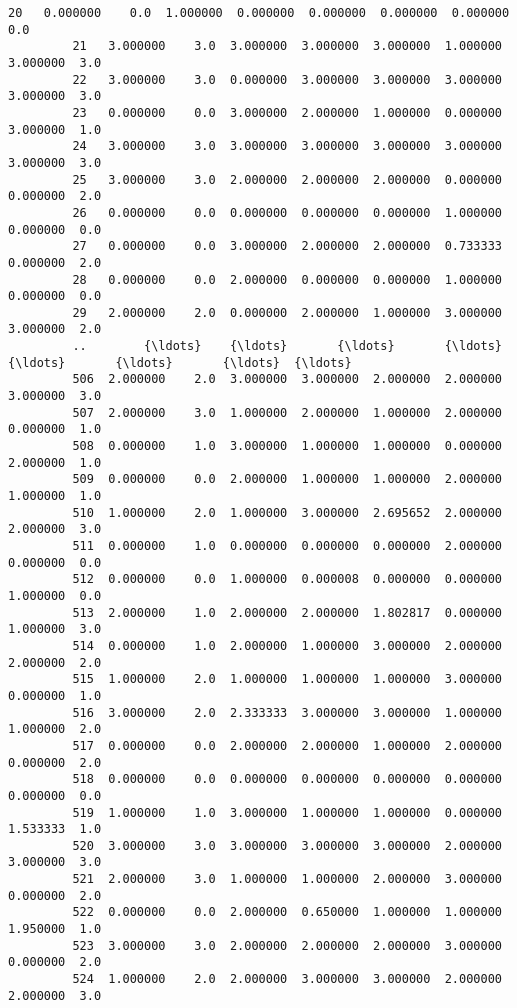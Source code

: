 \documentclass[11pt]{article}
\begin{document}
\begin{Verbatim}[commandchars=\\\{\}]
         20   0.000000    0.0  1.000000  0.000000  0.000000  0.000000  0.000000  0.0   
         21   3.000000    3.0  3.000000  3.000000  3.000000  1.000000  3.000000  3.0   
         22   3.000000    3.0  0.000000  3.000000  3.000000  3.000000  3.000000  3.0   
         23   0.000000    0.0  3.000000  2.000000  1.000000  0.000000  3.000000  1.0   
         24   3.000000    3.0  3.000000  3.000000  3.000000  3.000000  3.000000  3.0   
         25   3.000000    3.0  2.000000  2.000000  2.000000  0.000000  0.000000  2.0   
         26   0.000000    0.0  0.000000  0.000000  0.000000  1.000000  0.000000  0.0   
         27   0.000000    0.0  3.000000  2.000000  2.000000  0.733333  0.000000  2.0   
         28   0.000000    0.0  2.000000  0.000000  0.000000  1.000000  0.000000  0.0   
         29   2.000000    2.0  0.000000  2.000000  1.000000  3.000000  3.000000  2.0   
         ..        {\ldots}    {\ldots}       {\ldots}       {\ldots}       {\ldots}       {\ldots}       {\ldots}  {\ldots}   
         506  2.000000    2.0  3.000000  3.000000  2.000000  2.000000  3.000000  3.0   
         507  2.000000    3.0  1.000000  2.000000  1.000000  2.000000  0.000000  1.0   
         508  0.000000    1.0  3.000000  1.000000  1.000000  0.000000  2.000000  1.0   
         509  0.000000    0.0  2.000000  1.000000  1.000000  2.000000  1.000000  1.0   
         510  1.000000    2.0  1.000000  3.000000  2.695652  2.000000  2.000000  3.0   
         511  0.000000    1.0  0.000000  0.000000  0.000000  2.000000  0.000000  0.0   
         512  0.000000    0.0  1.000000  0.000008  0.000000  0.000000  1.000000  0.0   
         513  2.000000    1.0  2.000000  2.000000  1.802817  0.000000  1.000000  3.0   
         514  0.000000    1.0  2.000000  1.000000  3.000000  2.000000  2.000000  2.0   
         515  1.000000    2.0  1.000000  1.000000  1.000000  3.000000  0.000000  1.0   
         516  3.000000    2.0  2.333333  3.000000  3.000000  1.000000  1.000000  2.0   
         517  0.000000    0.0  2.000000  2.000000  1.000000  2.000000  0.000000  2.0   
         518  0.000000    0.0  0.000000  0.000000  0.000000  0.000000  0.000000  0.0   
         519  1.000000    1.0  3.000000  1.000000  1.000000  0.000000  1.533333  1.0   
         520  3.000000    3.0  3.000000  3.000000  3.000000  2.000000  3.000000  3.0   
         521  2.000000    3.0  1.000000  1.000000  2.000000  3.000000  0.000000  2.0   
         522  0.000000    0.0  2.000000  0.650000  1.000000  1.000000  1.950000  1.0   
         523  3.000000    3.0  2.000000  2.000000  2.000000  3.000000  0.000000  2.0   
         524  1.000000    2.0  2.000000  3.000000  3.000000  2.000000  2.000000  3.0   

\end{Verbatim}
\end{document}
